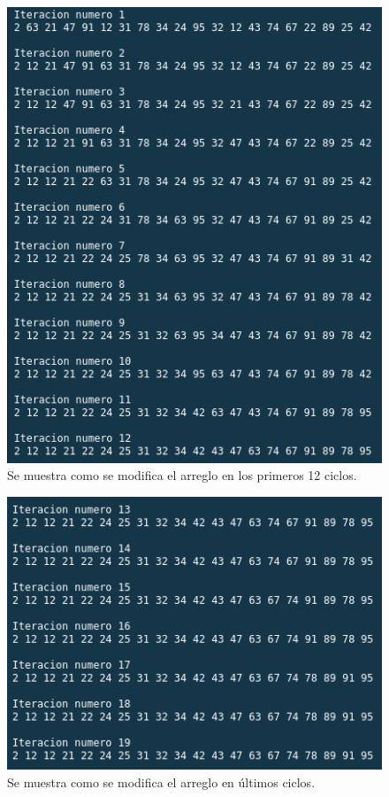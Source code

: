 \documentclass{article}
\begin{document}
			\begin{figure}[H]
				\centering
				\includegraphics[scale = 0.8]{images/e2-3-1}
				\caption{Se muestra como se modifica el arreglo en los primeros 12 ciclos.}
			\end{figure}
		
			\begin{figure}[H]
				\centering
				\includegraphics[scale = 0.8]{images/e2-3-2}
				\caption{Se muestra como se modifica el arreglo en últimos ciclos.}
			\end{figure}
			\newpage
			
\end{document}
